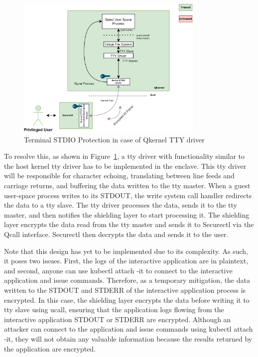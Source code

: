 \begin{figure}[htp]
    \centering
    \includegraphics[width=0.8\textwidth]{images/terminal_shiled3.png}
    \caption[Terminal STDIO Protection in case of using Qkernel TTY driver]{Terminal STDIO Protection in case of Qkernel TTY driver}
    \label{fig:terminal_shiled3}
\end{figure}

To resolve this, as shown in Figure~\ref{fig:terminal_shiled3}, a tty driver with functionality similar to the host kernel tty driver has to be implemented in the enclave. This tty driver will be responsible for character echoing, translating between line feeds and carriage returns, and buffering 
the data written to the tty master. When a guest user-space process writes to its STDOUT, the write system call handler redirects the data to a tty slave. The tty driver processes the data, sends it to the tty master, and then notifies the shielding 
layer to start processing it. The shielding layer encrypts the data read from the tty master and sends it to Securectl via the Qcall interface. Securectl then decrypts the data and sends it to the user.

Note that this design has yet to be implemented due to its complexity. As such, it poses two issues. First, the logs of the interactive application are in plaintext, and second, anyone can use kubectl attach -it to connect to the interactive 
application and issue commands. Therefore, as a temporary mitigation, the data written to the STDOUT and STDERR of the interactive application process is encrypted. In this case, the shielding layer encrypts the data before writing it to tty slave 
using ucall, ensuring that the application logs flowing from the interactive application STDOUT or STDERR are encrypted. Although an attacker can connect to the application and issue commands using kubectl attach -it, they will not obtain any 
valuable information because the results returned by the application are encrypted.

